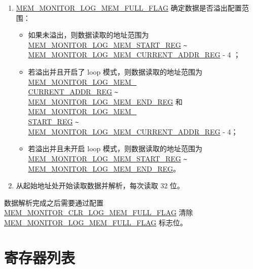 \documentclass[main\_\_CN.tex]{subfiles}
\begin{document}
\begin{enumerate}
    \item \hyperref[fielddesc:MEMMONITORLOGMEMFULLFLAG]{MEM\_MONITOR\_LOG\_MEM\_FULL\_FLAG} 确定数据是否溢出配置范围：
    \begin{itemize}
        \item 如果未溢出，则数据读取的地址范围为 \hyperref[regdesc:MEMMONITORLOGMEMSTARTREG]{MEM\_MONITOR\_LOG\_MEM\_START\_REG}  \verb+~+ \hyperref[regdesc:MEMMONITORLOGMEMCURRENTADDRREG]{MEM\_MONITOR\_LOG\_MEM\_CURRENT\_ADDR\_REG} - 4 ；
        \item 若溢出并且开启了 loop 模式，则数据读取的地址范围为 \hyperref[regdesc:MEMMONITORLOGMEMCURRENTADDRREG]{MEM\_MONITOR\_LOG\_MEM\_\\CURRENT\_ADDR\_REG} \verb+~+ \hyperref[regdesc:MEMMONITORLOGMEMENDREG]{MEM\_MONITOR\_LOG\_MEM\_END\_REG} 和\hyperref[regdesc:MEMMONITORLOGMEMSTARTREG]{MEM\_MONITOR\_LOG\_MEM\_\\START\_REG}  \verb+~+ \hyperref[regdesc:MEMMONITORLOGMEMCURRENTADDRREG]{MEM\_MONITOR\_LOG\_MEM\_CURRENT\_ADDR\_REG} - 4；
        \item 若溢出并且未开启 loop 模式，则数据读取的地址范围为 \hyperref[regdesc:MEMMONITORLOGMEMSTARTREG]{MEM\_MONITOR\_LOG\_MEM\_START\_REG} \verb+~+ \hyperref[regdesc:MEMMONITORLOGMEMENDREG]{MEM\_MONITOR\_LOG\_MEM\_END\_REG}。
    \end{itemize}
    \item 从起始地址处开始读取数据并解析，每次读取 32 位。

\end{enumerate}

数据解析完成之后需要通过配置 \hyperref[fielddesc:MEMMONITORCLRLOGMEMFULLFLAG]{MEM\_MONITOR\_CLR\_LOG\_MEM\_FULL\_FLAG} 清除 \\ \hyperref[fielddesc:MEMMONITORLOGMEMFULLFLAG]{MEM\_MONITOR\_LOG\_MEM\_FULL\_FLAG} 标志位。



\hypertarget{dbgassist-reg-summ}{}
\section{寄存器列表}
\label{sec:dbgassist-reg-summ}
\end{document}
